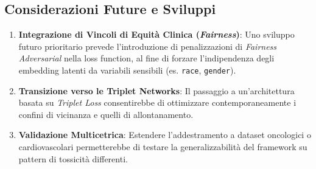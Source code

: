 \documentclass{article}
\begin{document}
\subsection*{Considerazioni Future e Sviluppi}
\begin{enumerate}
    \item \textbf{Integrazione di Vincoli di Equità Clinica (\textit{Fairness})}: Uno sviluppo futuro prioritario prevede l'introduzione di penalizzazioni di \textit{Fairness Adversarial} nella loss function, al fine di forzare l'indipendenza degli embedding latenti da variabili sensibili (es. \texttt{race}, \texttt{gender}).
    \item \textbf{Transizione verso le Triplet Networks}: Il passaggio a un'architettura basata su \textit{Triplet Loss} consentirebbe di ottimizzare contemporaneamente i confini di vicinanza e quelli di allontanamento.
    \item \textbf{Validazione Multicetrica}: Estendere l'addestramento a dataset oncologici o cardiovascolari permetterebbe di testare la generalizzabilità del framework su pattern di tossicità differenti.
\end{enumerate}
\end{document}
